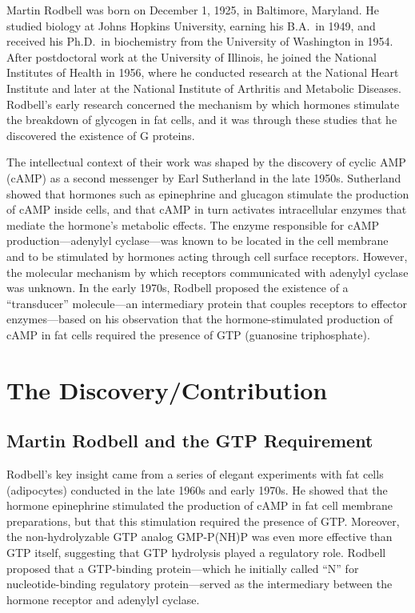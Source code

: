 Martin Rodbell was born on December 1, 1925, in Baltimore, Maryland. He studied biology at Johns Hopkins University, earning his B.A.\ in 1949, and received his Ph.D.\ in biochemistry from the University of Washington in 1954. After postdoctoral work at the University of Illinois, he joined the National Institutes of Health in 1956, where he conducted research at the National Heart Institute and later at the National Institute of Arthritis and Metabolic Diseases. Rodbell's early research concerned the mechanism by which hormones stimulate the breakdown of glycogen in fat cells, and it was through these studies that he discovered the existence of G proteins.

The intellectual context of their work was shaped by the discovery of cyclic AMP (cAMP) as a second messenger by Earl Sutherland in the late 1950s. Sutherland showed that hormones such as epinephrine and glucagon stimulate the production of cAMP inside cells, and that cAMP in turn activates intracellular enzymes that mediate the hormone's metabolic effects. The enzyme responsible for cAMP production---adenylyl cyclase---was known to be located in the cell membrane and to be stimulated by hormones acting through cell surface receptors. However, the molecular mechanism by which receptors communicated with adenylyl cyclase was unknown. In the early 1970s, Rodbell proposed the existence of a ``transducer'' molecule---an intermediary protein that couples receptors to effector enzymes---based on his observation that the hormone-stimulated production of cAMP in fat cells required the presence of GTP (guanosine triphosphate).

\section{The Discovery/Contribution}

\subsection{Martin Rodbell and the GTP Requirement}

Rodbell's key insight came from a series of elegant experiments with fat cells (adipocytes) conducted in the late 1960s and early 1970s. He showed that the hormone epinephrine stimulated the production of cAMP in fat cell membrane preparations, but that this stimulation required the presence of GTP. Moreover, the non-hydrolyzable GTP analog GMP-P(NH)P was even more effective than GTP itself, suggesting that GTP hydrolysis played a regulatory role. Rodbell proposed that a GTP-binding protein---which he initially called ``N'' for nucleotide-binding regulatory protein---served as the intermediary between the hormone receptor and adenylyl cyclase.

